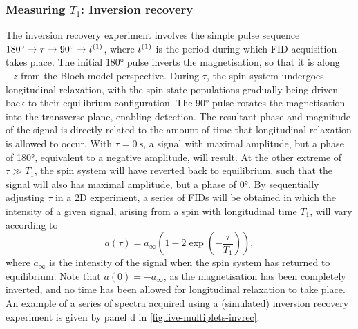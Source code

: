 \subsubsection{Measuring $T_1$: Inversion recovery}
\label{subsec:invrec}
The inversion recovery experiment involves the simple pulse sequence $\ang{180}
\rightarrow \tau \rightarrow \ang{90} \rightarrow t^{(1)}$, where $t^{(1)}$ is the
period during which \ac{FID} acquisition takes place. The initial
\ang{180} pulse inverts the magnetisation, so that it is along $-z$ from the
Bloch model perspective. During $\tau$, the spin system undergoes longitudinal
relaxation, with the spin state populations gradually being driven back to
their equilibrium configuration. The \ang{90} pulse rotates the magnetisation
into the transverse plane, enabling detection. The resultant phase and
magnitude of the signal is directly related to the amount of time that
longitudinal relaxation is allowed to occur. With $\tau = \qty{0}{\second}$, a
signal with maximal amplitude, but a phase of \ang{180}, equivalent to a
negative amplitude, will result. At the other extreme of $\tau \gg T_1$,
the spin system will have reverted
back to equilibrium, such that the signal will also has maximal amplitude, but a
phase of \ang{0}. By sequentially adjusting $\tau$ in a
\ac{2D} experiment, a series of \acp{FID} will be obtained in which the intensity
of a given signal, arising from a spin with longitudinal time $T_1$, will vary
according to
\begin{equation}
    a\left(\tau\right) = a_{\infty} \left( 1 - 2 \exp\left( -\frac{\tau}{T_1}\right) \right),
\end{equation}
where $a_{\infty}$ is the intensity of the signal when the spin system
has returned to equilibrium. Note that $a(0) = -a_{\infty}$, as the magnetisation
has been completely inverted, and no time has been allowed for longitudinal
relaxation to take place. An example of a series of spectra acquired using a
(simulated) inversion recovery experiment is given by panel d in
\cref{fig:five-multiplets-invrec}.

